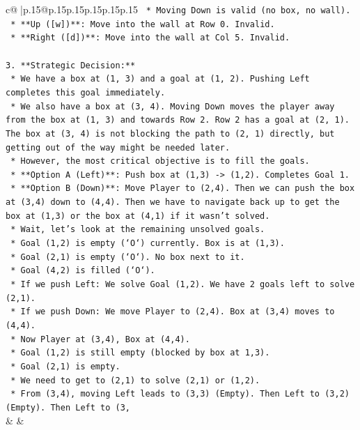 \documentclass{article}
\begin{document}
{\begin{supertabular}{c@{$\;$}|p{.15\linewidth}@{}p{.15\linewidth}p{.15\linewidth}p{.15\linewidth}p{.15\linewidth}p{.15\linewidth}}
{{{\texttt{        *   Moving Down is valid (no box, no wall).} \\
\texttt{    *   **Up ({[}w{]})**: Move into the wall at Row 0. Invalid.} \\
\texttt{    *   **Right ({[}d{]})**: Move into the wall at Col 5. Invalid.} \\
\\ 
\texttt{3.  **Strategic Decision:**} \\
\texttt{    *   We have a box at (1, 3) and a goal at (1, 2). Pushing Left completes this goal immediately.} \\
\texttt{    *   We also have a box at (3, 4). Moving Down moves the player away from the box at (1, 3) and towards Row 2. Row 2 has a goal at (2, 1). The box at (3, 4) is not blocking the path to (2, 1) directly, but getting out of the way might be needed later.} \\
\texttt{    *   However, the most critical objective is to fill the goals.} \\
\texttt{    *   **Option A (Left)**: Push box at (1,3) {-}> (1,2). Completes Goal 1.} \\
\texttt{    *   **Option B (Down)**: Move Player to (2,4). Then we can push the box at (3,4) down to (4,4). Then we have to navigate back up to get the box at (1,3) or the box at (4,1) if it wasn't solved.} \\
\texttt{    *   Wait, let's look at the remaining unsolved goals.} \\
\texttt{        *   Goal (1,2) is empty (`O`) currently. Box is at (1,3).} \\
\texttt{        *   Goal (2,1) is empty (`O`). No box next to it.} \\
\texttt{        *   Goal (4,2) is filled (`O`).} \\
\texttt{    *   If we push Left: We solve Goal (1,2). We have 2 goals left to solve (2,1).} \\
\texttt{    *   If we push Down: We move Player to (2,4). Box at (3,4) moves to (4,4).} \\
\texttt{        *   Now Player at (3,4), Box at (4,4).} \\
\texttt{        *   Goal (1,2) is still empty (blocked by box at 1,3).} \\
\texttt{        *   Goal (2,1) is empty.} \\
\texttt{        *   We need to get to (2,1) to solve (2,1) or (1,2).} \\
\texttt{        *   From (3,4), moving Left leads to (3,3) (Empty). Then Left to (3,2) (Empty). Then Left to (3,} \\
            }
        }
    }
    & & \\ \\


\end{supertabular}}
\end{document}
